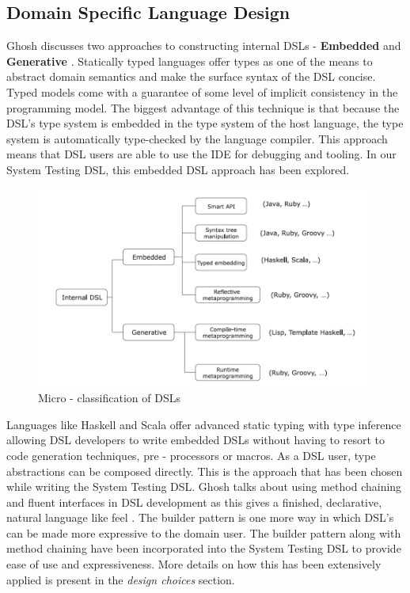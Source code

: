 \subsection{Domain Specific Language Design}
Ghosh discusses two approaches to constructing internal DSLs - \textbf{Embedded} and \textbf{Generative} \cite{dslsInAction}. Statically typed languages offer types as one of the means to abstract domain semantics and make the surface syntax of the DSL concise. Typed models come with a guarantee of some level of implicit consistency in the programming model. The biggest advantage of this technique is that because the DSL’s type system is embedded in the type system of the host language, the type system is automatically type-checked by the language compiler. This approach means that DSL users are able to use the IDE for debugging and tooling. In our System Testing DSL, this embedded DSL approach has been explored. 
\bigskip

\begin{figure}[H]
  \centering
    \includegraphics[height=250px]{figures/classification.png}
  \caption{Micro - classification of DSLs}
\end{figure}

\noindent
Languages like Haskell and Scala offer advanced static typing with type inference allowing DSL developers to write embedded DSLs without having to resort to code generation techniques, pre - processors or macros. As a DSL user, type abstractions can be composed directly. This is the approach that has been chosen while writing the System Testing DSL. Ghosh talks about using method chaining and fluent interfaces in DSL development as this gives a finished, declarative, natural language like feel \cite{fluentInterface}. The builder pattern is one more way in which DSL's can be made more expressive to the domain user. The builder pattern along with method chaining have been incorporated into the System Testing DSL to provide ease of use and expressiveness. More details on how this has been extensively applied is present in the \textit{design choices} section. 

